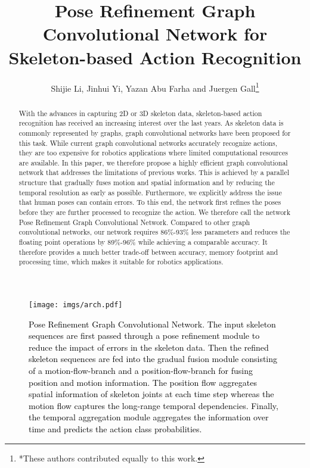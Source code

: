 \documentclass[letterpaper, 10 pt, conference]{ieeeconf}
\title{\LARGE \bf
Pose Refinement Graph Convolutional Network for Skeleton-based Action Recognition
}
\author{Shijie Li, Jinhui Yi, Yazan Abu Farha and Juergen Gall\thanks{*These authors contributed equally to this work.}}
\newcommand{\todo}[1]{{\textcolor{black}{#1}}}
\begin{document}
\maketitle
\thispagestyle{empty}
\pagestyle{empty}


\begin{abstract}
With the advances in capturing 2D or 3D skeleton data, skeleton-based action recognition has received an increasing interest over the last years. As skeleton data is commonly represented by graphs, graph convolutional networks have been proposed for this task. While current graph convolutional networks accurately recognize actions, they are too expensive for robotics applications where limited computational resources are available.
In this paper, we therefore propose a highly efficient graph convolutional network that addresses the limitations of previous works. This is achieved by a parallel structure that gradually fuses motion and spatial information and by reducing the temporal resolution as early as possible. Furthermore, we explicitly address the issue that human poses can contain errors. To this end, the network first refines the poses before they are further processed to recognize the action. We therefore call the network Pose Refinement Graph Convolutional Network. Compared to other  graph convolutional networks, our network requires 86\%-93\% less parameters and reduces the floating point operations by 89\%-96\% while achieving a comparable accuracy. It therefore provides a much better trade-off between accuracy, memory footprint and processing time, which makes it suitable for robotics applications.

\end{abstract}


\begin{figure*}[t]
    \centering
    \texttt{[image: imgs/arch.pdf]}
    \caption{\todo{Pose Refinement Graph Convolutional Network.
    The input skeleton sequences are first passed through a pose refinement module to reduce the impact of errors in the skeleton data. 
    Then the refined skeleton sequences are fed into the gradual fusion module consisting of a motion-flow-branch and a position-flow-branch for fusing position and motion information.
    The position flow aggregates spatial information of skeleton joints at each time step whereas the motion flow captures the long-range temporal dependencies.
    Finally, the temporal aggregation module aggregates the information over time and predicts the action class probabilities.}}
    \label{fig:arch}
    \vspace{-5mm}
\end{figure*}
\end{document}
